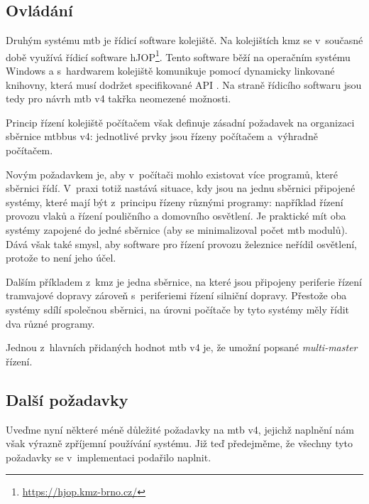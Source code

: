 \subsection{Ovládání}

Druhým  systému \gls{mtb} je řídicí software kolejiště. Na
kolejištích \gls{kmz} se v~současné době využívá řídicí software
hJOP\footnote{\url{https://hjop.kmz-brno.cz/}}. Tento software běží na
operačním systému Windows a s~hardwarem kolejiště komunikuje pomocí dynamicky
linkované knihovny, která musí dodržet specifikované API \cite{hjop:rcs:web}.
Na straně řídicího softwaru jsou tedy pro návrh \gls{mtb} v4 takřka neomezené
možnosti.

Princip řízení kolejiště počítačem však definuje zásadní požadavek na
organizaci sběrnice \gls{mtbbus} v4: jednotlivé prvky jsou řízeny počítačem
a~výhradně počítačem.

Novým požadavkem je, aby v~počítači mohlo existovat více programů, které
sběrnici řídí. V~praxi totiž nastává situace, kdy jsou na jednu sběrnici
připojené systémy, které mají být z~principu řízeny různými programy: například
řízení provozu vlaků a řízení pouličního a domovního osvětlení.  Je praktické mít
oba systémy zapojené do jedné sběrnice (aby se minimalizoval počet \gls{mtb}
modulů). Dává však také smysl, aby software pro řízení provozu železnice neřídil
osvětlení, protože to není jeho účel.

Dalším příkladem z~\gls{kmz} je jedna sběrnice, na které jsou připojeny
periferie řízení tramvajové dopravy zároveň s~periferiemi řízení silniční
dopravy. Přestože oba systémy sdílí společnou sběrnici, na úrovni počítače by
tyto systémy měly řídit dva různé programy.

Jednou z~hlavních přidaných hodnot \gls{mtb} v4 je, že umožní popsané
\textit{multi-master} řízení.

\subsection{Další požadavky}

Uveďme nyní některé méně důležité požadavky na \gls{mtb} v4, jejichž naplnění
nám však výrazně zpříjemní používání systému. Již teď předejměme, že všechny tyto
požadavky se v~implementaci podařilo naplnit.

